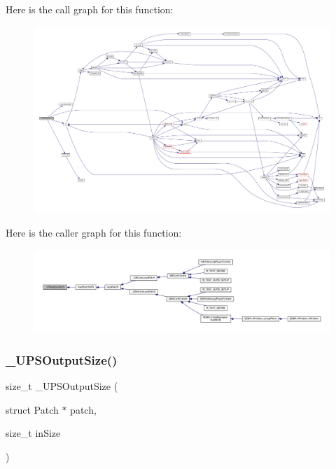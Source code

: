 Here is the call graph for this function\+:
\nopagebreak
\begin{figure}[H]
\begin{center}
\leavevmode
\includegraphics[width=350pt]{patch-ups_8c_ab17c39f3fe7102519b7d704a8722237e_cgraph}
\end{center}
\end{figure}
Here is the caller graph for this function\+:
\nopagebreak
\begin{figure}[H]
\begin{center}
\leavevmode
\includegraphics[width=350pt]{patch-ups_8c_ab17c39f3fe7102519b7d704a8722237e_icgraph}
\end{center}
\end{figure}
\mbox{\label{patch-ups_8c_a4a463d2dc2f7681f226214c02a505619}} 
\subsubsection{\texorpdfstring{\+\_\+\+U\+P\+S\+Output\+Size()}{\_UPSOutputSize()}}
{\footnotesize\ttfamily size\+\_\+t \+\_\+\+U\+P\+S\+Output\+Size (\begin{DoxyParamCaption}\item[{struct Patch $\ast$}]{patch,  }\item[{size\+\_\+t}]{in\+Size }\end{DoxyParamCaption})\hspace{0.3cm}{\ttfamily [static]}}

